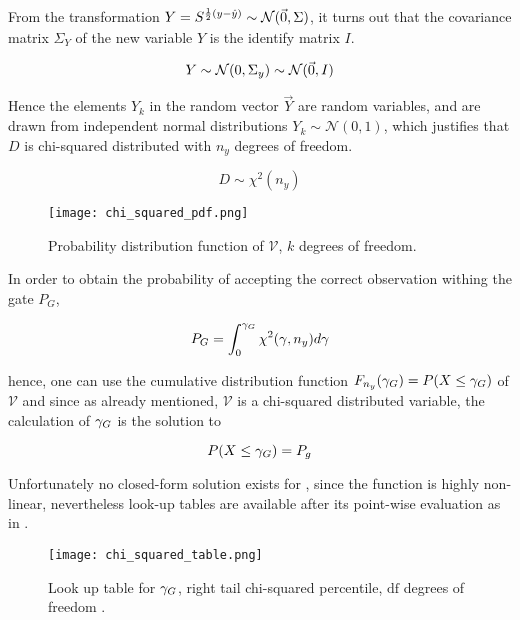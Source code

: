 From the transformation $ \begin{matrix}Y\end{matrix} = \begin{matrix}S\end{matrix}^{\frac{1}{2}({y}-{\hat{{y}}})} \sim \mathcal{N}(\vec{0},\Sigma)$, it turns out that the covariance matrix $\Sigma_Y$ of the new variable $Y$ is the identify matrix $I$.


$$ Y \sim \mathcal{N}(0,\Sigma_y) \sim \mathcal{N}(\vec{0},\begin{matrix}I\end{matrix}) $$

Hence the elements $Y_k$ in the random vector $\vec{Y}$ are random variables, and are drawn from independent normal distributions $Y_k \sim \mathcal{N}(0,1)$, which justifies that $D$ is chi-squared distributed with $n_y$ degrees of freedom.

\begin{equation}\label{key}
D \sim \chi^2(n_y)
\end{equation}




\begin{figure}[H]
	\centering
	\texttt{[image: chi\_squared\_pdf.png]}
	\caption{Probability distribution function of $\mathcal{V}$, $k$ degrees of freedom.}
	\label{fig:chisquared}
\end{figure}


In order to obtain the probability of accepting the correct observation withing the gate $P_G$, 

\begin{equation}\label{eq:gatingprobability}
P_G = \int_{0}^{{\gamma_G}} \chi^2(\gamma, n_y)d\gamma
\end{equation}

hence, one can use the cumulative distribution function $F_{n_{{y}}}({\gamma_G})=P(X \leq {\gamma_G})$ of $\mathcal{V}$ and since as already mentioned, $\mathcal{V}$ is a chi-squared distributed variable, the calculation of ${\gamma_G}$ is the solution to 

\begin{equation}\label{eq:gammasol}
P(X \leq {\gamma_G}) = P_g  \end{equation}


Unfortunately no closed-form solution exists for  , since the function is highly non-linear, nevertheless look-up tables are available after its point-wise evaluation as in .





\begin{figure}[H]
	\centering
	\texttt{[image: chi\_squared\_table.png]}
	\caption{Look up table for ${\gamma_G}$, right tail chi-squared percentile, $\text{df}$ degrees of freedom .}
	\label{fig:chisquaredtable}
\end{figure}



